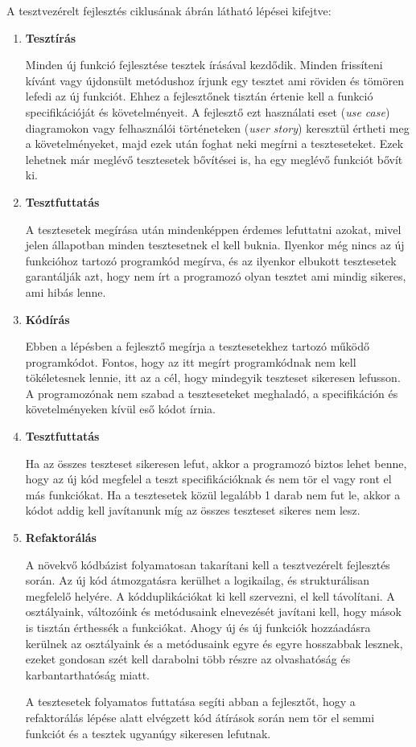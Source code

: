 A tesztvezérelt fejlesztés ciklusának  ábrán látható lépései kifejtve: \cite{beck_2003_tdd}
\begin{enumerate}
    \item \textbf{Tesztírás}

          Minden új funkció fejlesztése tesztek írásával kezdődik. Minden frissíteni kívánt vagy újdonsült metódushoz írjunk egy tesztet ami röviden és tömören lefedi az új funkciót. Ehhez a fejlesztőnek tisztán értenie kell a funkció specifikációját és követelményeit. A fejlesztő ezt használati eset (\emph{use case}) diagramokon vagy felhasználói történeteken (\emph{user story}) keresztül értheti meg a követelményeket, majd ezek után foghat neki megírni a teszteseteket. Ezek lehetnek már meglévő tesztesetek bővítései is, ha egy meglévő funkciót bővít ki.

    \item \textbf{Tesztfuttatás}

          A tesztesetek megírása után mindenképpen érdemes lefuttatni azokat, mivel jelen állapotban minden tesztesetnek el kell buknia. Ilyenkor még nincs az új funkcióhoz tartozó programkód megírva, és az ilyenkor elbukott tesztesetek garantálják azt, hogy nem írt a programozó olyan tesztet ami mindig sikeres, ami hibás lenne.

    \item \textbf{Kódírás}

          Ebben a lépésben a fejlesztő megírja a tesztesetekhez tartozó működő programkódot. Fontos, hogy az itt megírt programkódnak nem kell tökéletesnek lennie, itt az a cél, hogy mindegyik teszteset sikeresen lefusson. A programozónak nem szabad a teszteseteket meghaladó, a specifikáción és követelményeken kívül eső kódot írnia.

    \item \textbf{Tesztfuttatás}

          Ha az összes teszteset sikeresen lefut, akkor a programozó biztos lehet benne, hogy az új kód megfelel a teszt specifikációknak és nem tör el vagy ront el más funkciókat. Ha a tesztesetek közül legalább 1 darab nem fut le, akkor a kódot addig kell javítanunk míg az összes teszteset sikeres nem lesz.

    \item \textbf{Refaktorálás}

          A növekvő kódbázist folyamatosan takarítani kell a tesztvezérelt fejlesztés során. Az új kód átmozgatásra kerülhet a logikailag, és strukturálisan megfelelő helyére. A kódduplikációkat ki kell szervezni, el kell távolítani. A osztályaink, változóink és metódusaink elnevezését javítani kell, hogy mások is tisztán érthessék a funkciókat. Ahogy új és új funkciók hozzáadásra kerülnek az osztályaink és a metódusaink egyre és egyre hosszabbak lesznek, ezeket gondosan szét kell darabolni több részre az olvashatóság és karbantarthatóság miatt.

          A tesztesetek folyamatos futtatása segíti abban a fejlesztőt, hogy a refaktorálás lépése alatt elvégzett kód átírások során nem tör el semmi funkciót és a tesztek ugyanúgy sikeresen lefutnak.
\end{enumerate}

